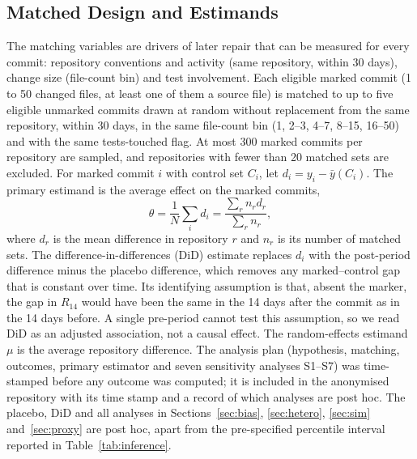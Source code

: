 \documentclass[runningheads]{llncs}
\begin{document}
\subsection{Matched Design and Estimands}

The matching variables are drivers of later repair that can be measured for every commit: repository conventions and activity (same repository, within 30 days), change size (file-count bin) and test involvement. Each eligible marked commit (1 to 50 changed files, at least one of them a source file) is matched to up to five eligible unmarked commits drawn at random without replacement from the same repository, within 30 days, in the same file-count bin (1, 2--3, 4--7, 8--15, 16--50) and with the same tests-touched flag. At most 300 marked commits per repository are sampled, and repositories with fewer than 20 matched sets are excluded. For marked commit $i$ with control set $C_i$, let $d_i = y_i - \bar{y}(C_i)$. The primary estimand is the average effect on the marked commits,
\begin{equation}\label{eq:theta}
\theta = \frac{1}{N}\sum_i d_i = \frac{\sum_r n_r d_r}{\sum_r n_r},
\end{equation}
where $d_r$ is the mean difference in repository $r$ and $n_r$ is its number of matched sets. The difference-in-differences (DiD) estimate replaces $d_i$ with the post-period difference minus the placebo difference, which removes any marked--control gap that is constant over time. Its identifying assumption is that, absent the marker, the gap in $R_{14}$ would have been the same in the 14 days after the commit as in the 14 days before. A single pre-period cannot test this assumption, so we read DiD as an adjusted association, not a causal effect. The random-effects estimand $\mu$ is the average repository difference. The analysis plan (hypothesis, matching, outcomes, primary estimator and seven sensitivity analyses S1--S7) was time-stamped before any outcome was computed; it is included in the anonymised repository with its time stamp and a record of which analyses are post hoc. The placebo, DiD and all analyses in Sections~\ref{sec:bias}, \ref{sec:hetero}, \ref{sec:sim} and~\ref{sec:proxy} are post hoc, apart from the pre-specified percentile interval reported in Table~\ref{tab:inference}.
\end{document}
